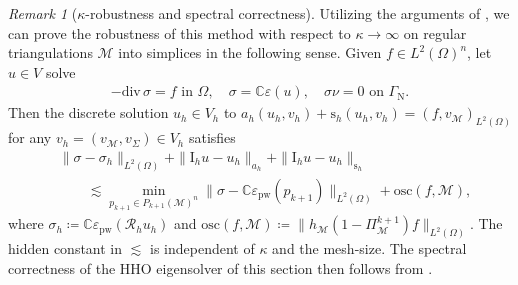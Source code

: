 \documentclass[a4paper]{amsart}
\numberwithin{equation}{section}
\renewcommand{\div}{\mathrm{div}}
\newcommand{\I}{\mathrm{I}}
\newcommand{\Mcal}{\mathcal{M}}
\newcommand{\s}{\mathrm{s}}
\newcommand{\pw}{\mathrm{pw}}
\theoremstyle{remark}
\newtheorem{remark}[theorem]{Remark}
\theoremstyle{definition}
\theoremstyle{assumptionnoperiod}
\begin{document}
\begin{remark}[$\kappa$-robustness and spectral correctness]
	Utilizing the arguments of \cite{CarstensenTran2024}, we can prove the robustness of this method with respect to $\kappa \to \infty$ on regular triangulations $\Mcal$ into simplices in the following sense.
	Given $f \in L^2(\Omega)^n$, let $u \in V$ solve
	\begin{align*}
		-\div\,\sigma = f \text{ in } \Omega, \quad\sigma = \mathbb{C} \varepsilon(u), \quad \sigma \nu = 0 \text{ on } \Gamma_\mathrm{N}.
	\end{align*}
	Then the discrete solution $u_h \in V_h$ to $a_h(u_h,v_h) + \s_h(u_h,v_h) = (f,v_\Mcal)_{L^2(\Omega)}$ for any $v_h = (v_\Mcal,v_\Sigma) \in V_h$ satisfies
	\begin{align*}
		&\|\sigma - \sigma_h\|_{L^2(\Omega)} + \|\I_h u - u_h\|_{a_h} + \|\I_h u - u_h\|_{\s_h}\\
		&\qquad \lesssim \min_{p_{k+1} \in P_{k+1}(\Mcal)^n} \|\sigma - \mathbb{C} \varepsilon_\pw(p_{k+1})\|_{L^2(\Omega)} + \mathrm{osc}(f,\Mcal),
	\end{align*}
	where $\sigma_h \coloneqq \mathbb{C} \varepsilon_\pw(\mathcal{R}_h u_h)$ and $\mathrm{osc}(f,\Mcal) \coloneqq \|h_\Mcal(1 - \Pi_\Mcal^{k+1}) f\|_{L^2(\Omega)}$.
	The hidden constant in $\lesssim$ is independent of $\kappa$ and the mesh-size. The spectral correctness of the HHO eigensolver of this section then follows from \cite{CaloCicuttinDengErn2019}.
\end{remark}
\end{document}
